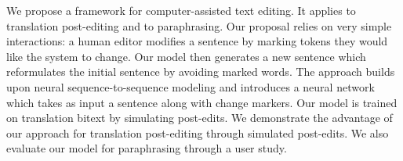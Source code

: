 We propose a framework for computer-assisted text editing. It applies to translation post-editing and to paraphrasing. Our proposal relies on very simple interactions: a human editor modifies a sentence by marking tokens they would like the system to change. Our model then generates a new sentence which reformulates the initial sentence by avoiding marked words. The approach builds upon neural sequence-to-sequence modeling and introduces a neural network which takes as input a sentence along with change markers. Our model is trained on translation bitext by simulating post-edits. We demonstrate the advantage of our approach for translation post-editing through simulated post-edits. We also evaluate our model for paraphrasing through a user study.
